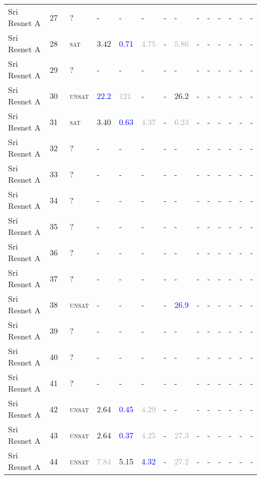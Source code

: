 \begin{center}
{\begin{longtable}{@{}llllllllllllll@{}}
Sri Resnet A & 27 & ~? & - & - & - & - & - & - & - & - & - & - & - \\
Sri Resnet A & 28 & ~\textsc{sat} & \textcolor{second}{3.42} & \textcolor{blue}{0.71} & \textcolor{darkgray}{4.75} & - & \textcolor{darkgray}{5.86} & - & - & - & - & - & - \\
Sri Resnet A & 29 & ~? & - & - & - & - & - & - & - & - & - & - & - \\
Sri Resnet A & 30 & ~\textsc{unsat} & \textcolor{blue}{22.2} & \textcolor{darkgray}{121} & - & - & \textcolor{second}{26.2} & - & - & - & - & - & - \\
Sri Resnet A & 31 & ~\textsc{sat} & \textcolor{second}{3.40} & \textcolor{blue}{0.63} & \textcolor{darkgray}{4.37} & - & \textcolor{darkgray}{6.23} & - & - & - & - & - & - \\
Sri Resnet A & 32 & ~? & - & - & - & - & - & - & - & - & - & - & - \\
Sri Resnet A & 33 & ~? & - & - & - & - & - & - & - & - & - & - & - \\
Sri Resnet A & 34 & ~? & - & - & - & - & - & - & - & - & - & - & - \\
Sri Resnet A & 35 & ~? & - & - & - & - & - & - & - & - & - & - & - \\
Sri Resnet A & 36 & ~? & - & - & - & - & - & - & - & - & - & - & - \\
Sri Resnet A & 37 & ~? & - & - & - & - & - & - & - & - & - & - & - \\
Sri Resnet A & 38 & ~\textsc{unsat} & - & - & - & - & \textcolor{blue}{26.9} & - & - & - & - & - & - \\
Sri Resnet A & 39 & ~? & - & - & - & - & - & - & - & - & - & - & - \\
Sri Resnet A & 40 & ~? & - & - & - & - & - & - & - & - & - & - & - \\
Sri Resnet A & 41 & ~? & - & - & - & - & - & - & - & - & - & - & - \\
Sri Resnet A & 42 & ~\textsc{unsat} & \textcolor{second}{2.64} & \textcolor{blue}{0.45} & \textcolor{darkgray}{4.29} & - & - & - & - & - & - & - & - \\
Sri Resnet A & 43 & ~\textsc{unsat} & \textcolor{second}{2.64} & \textcolor{blue}{0.37} & \textcolor{darkgray}{4.25} & - & \textcolor{darkgray}{27.3} & - & - & - & - & - & - \\
Sri Resnet A & 44 & ~\textsc{unsat} & \textcolor{darkgray}{7.84} & \textcolor{second}{5.15} & \textcolor{blue}{4.32} & - & \textcolor{darkgray}{27.2} & - & - & - & - & - & - \\

\end{longtable}}
\end{center}
